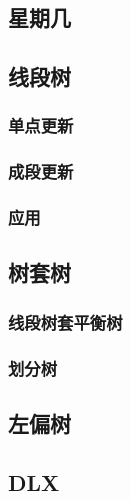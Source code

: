 \documentclass[a4paper]{article}
\begin{document}
\begin{CJK*}{UTF8}{gbsn}
\begin{multicols}{3}
\begin{flushleft}
\subsection{星期几}


\subsection{线段树}

\subsubsection{单点更新}


\subsubsection{成段更新}



\subsubsection{应用}


\subsection{树套树}
\subsubsection{线段树套平衡树}


\subsubsection{划分树}


\subsection{左偏树}


\subsection{DLX}



\end{flushleft}
\end{multicols}
\end{CJK*}
\end{document}
